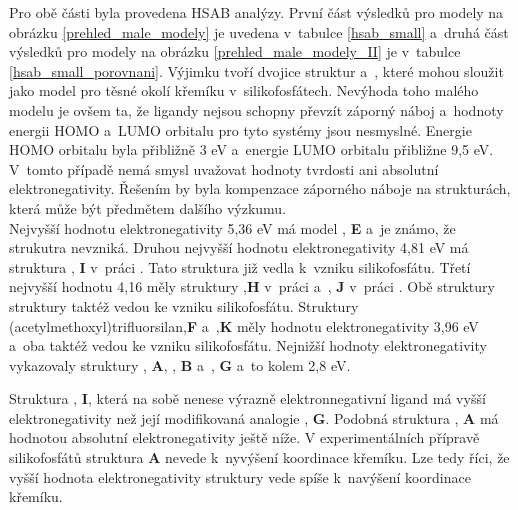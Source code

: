 \documentclass[
digital, %
table,   %
lof,     %
lot,     %
oneside,
]{fithesis3}
\begin{document}
Pro obě části byla provedena HSAB analýzy. První část výsledků pro modely na obrázku \ref{prehled_male_modely} je uvedena v~tabulce \ref{hsab_small} a~druhá část výsledků pro modely na obrázku \ref{prehled_male_modely_II} je v~tabulce \ref{hsab_small_porovnani}. Výjimku tvoří dvojice struktur  a~, které mohou sloužit jako model pro těsné okolí křemíku v~silikofosfátech. Nevýhoda toho malého modelu je ovšem ta, že ligandy nejsou schopny převzít záporný náboj a~hodnoty energii HOMO a~LUMO orbitalu pro tyto systémy jsou nesmyslné. Energie HOMO orbitalu byla přibližně 3 eV a~energie LUMO orbitalu přibližne 9,5 eV. V~tomto případě nemá smysl uvažovat hodnoty tvrdosti ani absolutní elektronegativity. Řešením by byla kompenzace záporného náboje na strukturách, která může být předmětem dalšího výzkumu.\\

Nejvyšší hodnotu elektronegativity 5,36 eV má model , \textbf{E} a~je známo, že strukutra  nevzniká. Druhou nejvyšší hodnotu elektronegativity 4,81 eV má struktura , \textbf{I} v~práci \cite{jahnigen2012synthesis}. Tato struktura již vedla k~vzniku silikofosfátu. Třetí nejvyšší hodnotu 4,16 měly struktury ,\textbf{H} v~práci \cite{aksamentova2009synthesis} a~, \textbf{J} v~práci \cite{Styskalik2015thesis}. Obě struktury struktury taktéž vedou ke vzniku silikofosfátu. Struktury (acetylmethoxyl)trifluorsilan,\textbf{F} a~,\textbf{K} měly hodnotu elektronegativity 3,96 eV a~oba taktéž vedou ke vzniku silikofosfátu. Nejnižší hodnoty elektronegativity vykazovaly struktury , \textbf{A}, , \textbf{B} a~, \textbf{G} a~to kolem 2,8 eV.

Struktura , \textbf{I}, která na sobě nenese výrazně elektronnegativní ligand má vyšší elektronegativity než její modifikovaná analogie , \textbf{G}. Podobná struktura , \textbf{A} má hodnotou absolutní elektronegativity ještě níže. V experimentálních přípravě silikofosfátů struktura \textbf{A} nevede k~nyvýšení koordinace křemíku. Lze tedy říci, že vyšší hodnota elektronegativity struktury vede spíše k~navýšení koordinace křemíku.
\end{document}
